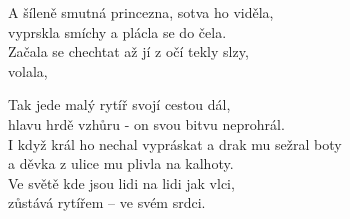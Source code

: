 \cho{}

\ve{}
A šíleně smutná princezna, sotva ho viděla,\\
vyprskla smíchy a plácla se do čela.\\
Začala se chechtat až jí z očí tekly slzy,\\
 volala, 

\cho{}

\ve{}
Tak jede malý rytíř svojí cestou dál,\\
hlavu hrdě vzhůru - on svou bitvu neprohrál.\\
I když král ho nechal vypráskat a drak mu sežral boty\\
a děvka z ulice mu plivla na kalhoty.\\
Ve světě kde jsou lidi na lidi jak vlci,\\
zůstává rytířem -- ve svém srdci.

\cho{}

\esong{}